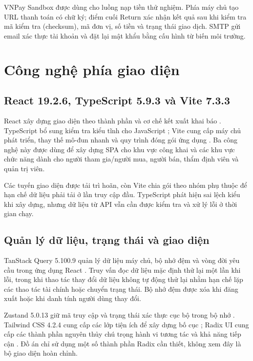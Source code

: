 \documentclass[../DoAn.tex]{subfiles}
\begin{document}
VNPay Sandbox được dùng cho luồng nạp tiền thử nghiệm. Phía máy chủ tạo URL thanh toán có chữ ký; điểm cuối Return xác nhận kết quả sau khi kiểm tra mã kiểm tra (checksum), mã đơn vị, số tiền và trạng thái giao dịch. SMTP gửi email xác thực tài khoản và đặt lại mật khẩu bằng cấu hình từ biến môi trường.

\section{Công nghệ phía giao diện}

\subsection{React 19.2.6, TypeScript 5.9.3 và Vite 7.3.3}

React xây dựng giao diện theo thành phần và cơ chế kết xuất khai báo \cite{reactdocs}. TypeScript bổ sung kiểm tra kiểu tĩnh cho JavaScript \cite{bierman2014typescript}; Vite cung cấp máy chủ phát triển, thay thế mô-đun nhanh và quy trình đóng gói ứng dụng \cite{vitedocs}. Ba công nghệ này được dùng để xây dựng SPA cho khu vực công khai và các khu vực chức năng dành cho người tham gia/người mua, người bán, thẩm định viên và quản trị viên.

Các tuyến giao diện được tải trì hoãn, còn Vite chia gói theo nhóm phụ thuộc để hạn chế dữ liệu phải tải ở lần truy cập đầu. TypeScript phát hiện sai lệch kiểu khi xây dựng, nhưng dữ liệu từ API vẫn cần được kiểm tra và xử lý lỗi ở thời gian chạy.

\subsection{Quản lý dữ liệu, trạng thái và giao diện}

TanStack Query 5.100.9 quản lý dữ liệu máy chủ, bộ nhớ đệm và vòng đời yêu cầu trong ứng dụng React \cite{reactquerydocs}. Truy vấn đọc dữ liệu mặc định thử lại một lần khi lỗi, trong khi thao tác thay đổi dữ liệu không tự động thử lại nhằm hạn chế lặp các thao tác tài chính hoặc chuyển trạng thái. Bộ nhớ đệm được xóa khi đăng xuất hoặc khi danh tính người dùng thay đổi.

Zustand 5.0.13 giữ mã truy cập và trạng thái xác thực cục bộ trong bộ nhớ \cite{zustanddocs}. Tailwind CSS 4.2.4 cung cấp các lớp tiện ích để xây dựng bố cục \cite{tailwinddocs}; Radix UI cung cấp các thành phần nguyên thủy chú trọng hành vi tương tác và khả năng tiếp cận \cite{radixdocs}. Đồ án chỉ sử dụng một số thành phần Radix cần thiết, không xem đây là bộ giao diện hoàn chỉnh.
\end{document}
